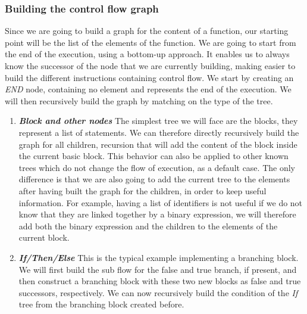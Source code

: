 \subsubsection{Building the control flow graph}
\label{subsubsec:building_the_graph}
Since we are going to build a graph for the content of a function, our starting point will be the list of the elements of the function.
We are going to start from the end of the execution, using a bottom-up approach.
It enables us to always know the successor of the node that we are currently building, making easier to build the different instructions containing control flow.
We start by creating an \emph{END} node, containing no element and represents the end of the execution.
We will then recursively build the graph by matching on the type of the tree.

\begin{enumerate}
	\item \textbf{\textit{Block and other nodes}} \newline 
	\label{subsubsec:block_and_others}
	The simplest tree we will face are the blocks, they represent a list of statements.
	We can therefore directly recursively build the graph for all children, recursion that will add the content of the block inside the current basic block. 
	This behavior can also be applied to other known trees which do not change the flow of execution, as a default case.
	The only difference is that we are also going to add the current tree to the elements after having built the graph for the children, in order to keep useful information. 
	For example, having a list of identifiers is not useful if we do not know that they are linked together by a binary expression, we will therefore add both the binary expression and the children to the elements of the current block.
	
	\item \textbf{\textit{If/Then/Else}} \newline 
	\label{subsubsec:if_then_else}
	This is the typical example implementing a branching block. 
	We will first build the sub flow for the false and true branch, if present, and then construct a branching block with these two new blocks as false and true successors, respectively.
	We can now recursively build the condition of the \emph{If} tree from the branching block created before.
	

\end{enumerate}
